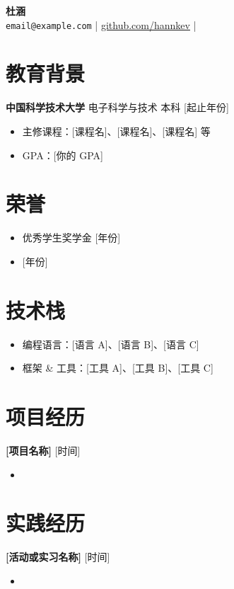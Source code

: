 \documentclass[12pt,a4paper]{article}
\begin{document}
\begin{center}
  {\LARGE \textbf{杜涵}} \\[0.5em]
  \texttt{email@example.com} \quad | \quad
  \href{https://github.com/hannkev}{github.com/hannkev} \quad | \quad
  [城市]
\end{center}

\section*{教育背景}
\textbf{中国科学技术大学} \quad 电子科学与技术 \quad 本科 \hfill [起止年份]
\begin{itemize}
  \item 主修课程：[课程名]、[课程名]、[课程名] 等
  \item GPA：[你的 GPA]
\end{itemize}

\section*{荣誉}
\begin{itemize}
  \item 优秀学生奖学金 \hfill [年份]
  \item [奖学金或荣誉名称] \hfill [年份]
\end{itemize}

\section*{技术栈}
\begin{itemize}
  \item 编程语言：[语言 A]、[语言 B]、[语言 C]
  \item 框架 \& 工具：[工具 A]、[工具 B]、[工具 C]
\end{itemize}

\section*{项目经历}
\textbf{[项目名称]} \hfill [时间]
\begin{itemize}
  \item [一句话描述项目内容和你的贡献]
\end{itemize}

\section*{实践经历}
\textbf{[活动或实习名称]} \hfill [时间]
\begin{itemize}
  \item [一句话描述]
\end{itemize}
\end{document}
